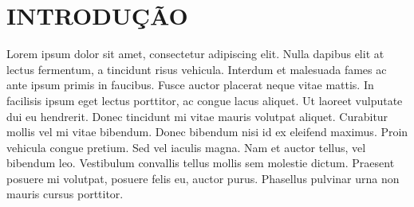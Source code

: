 \chapter{INTRODUÇÃO}
\label{chap:introducao}

Lorem ipsum dolor sit amet, consectetur adipiscing elit. Nulla dapibus elit at lectus fermentum, a tincidunt risus vehicula. Interdum et malesuada fames ac ante ipsum primis in faucibus. Fusce auctor placerat neque vitae mattis. In facilisis ipsum eget lectus porttitor, ac congue lacus aliquet. Ut laoreet vulputate dui eu hendrerit. Donec tincidunt mi vitae mauris volutpat aliquet. Curabitur mollis vel mi vitae bibendum. Donec bibendum nisi id ex eleifend maximus. Proin vehicula congue pretium. Sed vel iaculis magna. Nam et auctor tellus, vel bibendum leo. Vestibulum convallis tellus mollis sem molestie dictum. Praesent posuere mi volutpat, posuere felis eu, auctor purus. Phasellus pulvinar urna non mauris cursus porttitor.